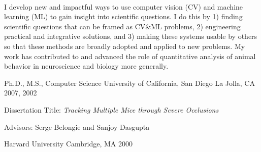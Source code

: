 \documentclass[11pt, letterpaper]{awesome-cv}
\begin{document}
\makecvheader[C]


% 
% 
% 
% 

\vspace{\acvSectionContentTopSkip}\\
I develop new and impactful ways to use computer vision (CV) and machine learning (ML) to gain insight into scientific questions. I do this by 1) finding scientific questions that can be framed as CV\&ML problems, 2) engineering practical and integrative solutions, and 3) making these systems usable by others so that these methods are broadly adopted and applied to new problems. My work has contributed to and advanced the role of quantitative analysis of animal behavior in neuroscience and biology more generally.

\begin{cventries}
  \cventry
    {Ph.D., M.S., Computer Science} %
    {University of California, San Diego} %
    {La Jolla, CA} %
    {2007, 2002} %
    {
      \begin{cvitems} %
      \item Dissertation Title: {\it Tracking Multiple Mice through Severe Occlusions}
      \item Advisors: Serge Belongie and Sanjoy Dasgupta
      \end{cvitems}
    }
    {Harvard University}
    {Cambridge, MA}
    {2000}
    {}
\end{cventries}
\vspace{-4mm}


\begin{cventries}
\end{cventries}
\end{document}
